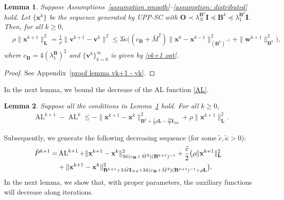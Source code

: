 \documentclass[12pt,draftcls,onecolumn]{IEEEtran}
\newtheorem{lemma}{Lemma}
\begin{document}
\begin{lemma} \label{lemma vk+1 - vk}
	Suppose Assumptions~\ref{assumption smooth}--\ref{assumption: distributed} hold. Let $\{\mathbf{x}^k\}$ be the sequence generated by UPP-SC with $\mathbf{O}\prec \lambda_N^{\mathbf{B}^k} \mathbf{I}\preceq \mathbf{B}^{k}\preceq \lambda_1^{\mathbf{B}^k}\mathbf{I} $. Then, for all $k\geq 0$,
	\begin{align}
		&\rho\|\mathbf{x}^{k+1}\|^2_{\mathbf{L}}=\frac{1}{\rho}\|\mathbf{v}^{k+1}-\mathbf{v}^k\|^2\leq 3\tilde{\kappa} \big((c_{\mathbf{B}}+\bar{M}^2)\|\mathbf{x}^k-\mathbf{x}^{k-1}\|^2_{(\mathbf{B}^{k})^{-1}}+\|\mathbf{w}^{k+1}\|^2_{\mathbf{B}^k}\big), \label{vk+1 - vk}
	\end{align}
	where $c_{\mathbf{B}}=4(\lambda_1^\mathbf{B})^2$ and $\{\mathbf{v}^k\}_{k=0}^\infty$ is given by \eqref{vk+1 opt}.
\end{lemma}
\begin{proof}
	See Appendix~\ref{proof lemma vk+1 - vk}.
\end{proof}

In the next lemma, we bound the decrease of the AL function \eqref{AL}.

\begin{lemma} \label{lemma ALk+1 - ALk}
	Suppose all the conditions in Lemma~\ref{lemma vk+1 - vk} hold. For all $k\geq 0$,
	\begin{align}
		&\operatorname{AL}^{k+1}-\operatorname{AL}^{k} \leq  -\|\mathbf{x}^{k+1}-\mathbf{x}^{k}\|^2_{\mathbf{B}^k+\frac{1}{2}\rho \mathbf{L}-\frac{\bar{M}}{2}\mathbf{I}_{Nd}} + \rho\|\mathbf{x}^{k+1}\|^2_{\mathbf{L}}. \label{ALk+1 - ALk lemma}
	\end{align}
\end{lemma}

 

Subsequently, we generate the following decreasing sequence (for some $\tilde{c},\tilde{\kappa}>0$):
\begin{align}
	\tilde{P}^{k+1}=&\operatorname{AL}^{k+1}+\|\mathbf{x}^{k+1}-\mathbf{x}^k\|^2_{3\tilde{\kappa} (c_{\mathbf{B}}+\bar{M}^2)(\mathbf{B}^{k+1})^{-1}}+\frac{\tilde{c}}{2}\big(\rho\|\mathbf{x}^{k+1}\|^2_\mathbf{L}\notag\\
    &+\|\mathbf{x}^{k+1}-\mathbf{x}^k\|^2_{\mathbf{B}^{k+1}+3\bar{M}\mathbf{I}_{Nd}+3\tilde{\kappa} (c_{\mathbf{B}}+\bar{M}^2)(\mathbf{B}^{k+1})^{-1}+\rho \mathbf{L}}\big). \label{tilde Pk+1}
\end{align}
In the next lemma, we show that, with proper parameters, the auxiliary functions will decrease along iterations. 
\end{document}

